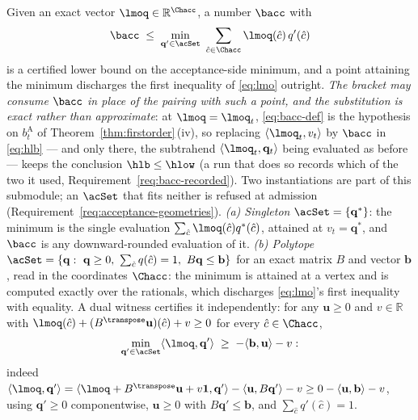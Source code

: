 \begin{remark}
Given an exact vector $\lmoq\in\mathbb{R}^{\Chacc}$, a number $\bacc$ with
\begin{equation}\label{eq:bacc-def}
  \bacc\;\le\;\min_{\mathbf q'\in\acSet}\
  \sum_{\hat c\in\Chacc}\lmoq(\hat c)\,q'(\hat c)
\end{equation}
is a certified lower bound on the acceptance-side minimum, and a point
attaining the minimum discharges the first inequality of \eqref{eq:lmo}
outright. \emph{The bracket may consume $\bacc$ in place of the pairing
with such a point, and the substitution is exact rather than
approximate}: at $\lmoq=\lmoq_t$, \eqref{eq:bacc-def} is the hypothesis on
$b^{\mathrm A}_t$ of Theorem~\ref{thm:firstorder}\,(iv), so replacing
$\langle\lmoq_t,v_t\rangle$ by $\bacc$ in \eqref{eq:hlb} --- and only
there, the subtrahend $\langle\lmoq_t,\mathbf q_t\rangle$ being evaluated
as before --- keeps the conclusion $\hlb\le\hlow$ (a run that does so
records which of the two it used, Requirement~\ref{req:bacc-recorded}). Two instantiations are part of this submodule; an $\acSet$
that fits neither is refused at admission
(Requirement~\ref{req:acceptance-geometries}).
\emph{(a) Singleton} $\acSet=\{\mathbf q^{*}\}$: the minimum is the single
evaluation $\sum_{\hat c}\lmoq(\hat c)q^{*}(\hat c)$, attained at
$v_t=\mathbf q^{*}$, and $\bacc$ is any downward-rounded evaluation of it.
\emph{(b) Polytope}
$\acSet=\{\mathbf q:\ \mathbf q\ge0,\ \textstyle\sum_{\hat c}q(\hat c)=1,\
B\mathbf q\le\mathbf b\}$ for an exact matrix $B$ and vector
$\mathbf b$, read in the coordinates $\Chacc$: the minimum is attained at
a vertex and is computed exactly over the rationals, which discharges
\eqref{eq:lmo}'s first inequality with equality. A dual witness certifies
it independently: for any $\mathbf u\ge0$ and $v\in\mathbb{R}$ with
$\lmoq(\hat c)+(B^{\transpose}\mathbf u)(\hat c)+v\ge0$ for every $\hat
c\in\Chacc$,
\begin{equation*}
  \min_{\mathbf q'\in\acSet}\langle\lmoq,\mathbf q'\rangle
  \;\ge\;-\langle\mathbf b,\mathbf u\rangle-v :
\end{equation*}
indeed $\langle\lmoq,\mathbf q'\rangle
=\langle\lmoq+B^{\transpose}\mathbf u+v\mathbf 1,\mathbf q'\rangle
-\langle\mathbf u,B\mathbf q'\rangle-v
\ge0-\langle\mathbf u,\mathbf b\rangle-v$, using $\mathbf q'\ge0$
componentwise, $\mathbf u\ge0$ with $B\mathbf q'\le\mathbf b$, and
$\sum_{\hat c}q'(\hat c)=1$.


\end{remark}
